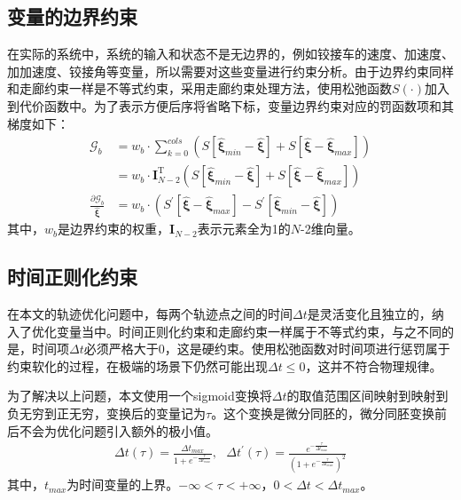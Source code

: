 \documentclass[master,academic]{ysuthesis} %
\begin{document}
		\subsection{变量的边界约束}
		在实际的系统中，系统的输入和状态不是无边界的，例如铰接车的速度、加速度、加加速度、铰接角等变量，所以需要对这些变量进行约束分析。由于边界约束同样和走廊约束一样是不等式约束，采用走廊约束处理方法，使用松弛函数$S(\cdot)$加入到代价函数中。为了表示方便后序将省略下标，变量边界约束对应的罚函数项和其梯度如下：
		\begin{equation}
			\begin{aligned}
				\mathcal{G}_b&=w_b\cdot \sum_{k=0}^{cols}{\left( S\left[ \hat{\bm{\xi}}_{min}-\hat{\bm{\xi}} \right] +S\left[ \hat{\bm{\xi}}-\hat{\bm{\xi}}_{max} \right] \right)}\\
				&=w_b\cdot \bm{I}_{N-2}^{\mathrm{T}}\left( S\left[ \hat{\bm{\xi}}_{min}-\hat{\bm{\xi}} \right] +S\left[ \hat{\bm{\xi}}-\hat{\bm{\xi}}_{max} \right] \right)\\
				\frac{\partial \mathcal{G}_b}{\hat{\bm{\xi}}}&=w_b\cdot \left( S^{'}\left[ \hat{\bm{\xi}}-\hat{\bm{\xi}}_{max} \right] -S^{'}\left[ \hat{\bm{\xi}}_{min}-\hat{\bm{\xi}} \right] \right)
			\end{aligned}
			\label{eq:Gb}
		\end{equation}
		其中，$w_b$是边界约束的权重，$\bm{I}_{N-2}$表示元素全为1的$N$-2维向量。

		\subsection{时间正则化约束}
		在本文的轨迹优化问题中，每两个轨迹点之间的时间$\Delta t$是灵活变化且独立的，纳入了优化变量当中。时间正则化约束和走廊约束一样属于不等式约束，与之不同的是，时间项$\Delta t$必须严格大于0，这是硬约束。使用松弛函数对时间项进行惩罚属于约束软化的过程，在极端的场景下仍然可能出现$\Delta t \le 0$，这并不符合物理规律。

		为了解决以上问题，本文使用一个sigmoid变换将$\Delta t$的取值范围区间映射到映射到负无穷到正无穷，变换后的变量记为$\tau$。这个变换是微分同胚的，微分同胚变换前后不会为优化问题引入额外的极小值。
		\begin{equation}
			\begin{aligned}
				\Delta t\left( \tau \right) =\frac{\Delta t_{max}}{1+e^{-\frac{\tau}{\Delta t_{max}}}},\,\,\,\,\Delta t^{'}\left( \tau \right) =\frac{e^{-\frac{\tau}{\Delta t_{max}}}}{\left( 1+e^{-\frac{\tau}{\Delta t_{max}}} \right) ^2}
			\end{aligned}
		\end{equation}
		其中，$t_{max}$为时间变量的上界。$-\infty <\tau <+\infty $，$0<\Delta t<\Delta t_{max}$。
		
\end{document}

